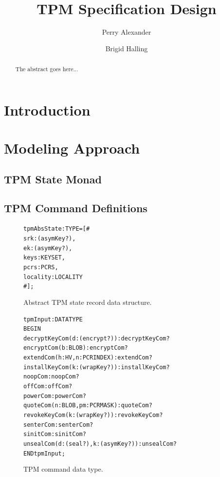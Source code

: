 \documentclass[10pt]{article}
\title{TPM Specification Design}
\author{Perry Alexander \and Brigid Halling}
\begin{document}
\maketitle
\tableofcontents
\listoffigures
\listoftables

\begin{abstract}
  The abstract goes here...
\end{abstract}

\section{Introduction}

\section{Modeling Approach}

\subsection{TPM State Monad}

\subsection{TPM Command Definitions}

\begin{figure}
\begin{alltt}
  tpmAbsState : TYPE = [#
                       srk : (asymKey?),
                       ek : (asymKey?),
                       keys : KEYSET,
                       pcrs : PCRS,
                       locality : LOCALITY
                       #];
\end{alltt}
\caption{Abstract TPM state record data structure.}
\label{fig:tpm-abs-state}
\end{figure}

\begin{figure}
\begin{alltt}
  tpmInput : DATATYPE
  BEGIN
    decryptKeyCom(d:(encrypt?)) : decryptKeyCom?
    encryptCom(b:BLOB) : encryptCom? %
    extendCom(h:HV,n:PCRINDEX) : extendCom?
    installKeyCom(k:(wrapKey?)): installKeyCom?
    noopCom : noopCom?
    offCom : offCom?
    powerCom : powerCom?
    quoteCom(n:BLOB,pm:PCRMASK) : quoteCom? %
    revokeKeyCom(k:(wrapKey?)): revokeKeyCom?
    senterCom : senterCom? %
    sinitCom : sinitCom? %
    unsealCom(d:(seal?),k:(asymKey?)) : unsealCom?   
  END tpmInput;
\end{alltt}
\caption{TPM command data type.}
\label{fig:tpm-command}
\end{figure}
\end{document}

